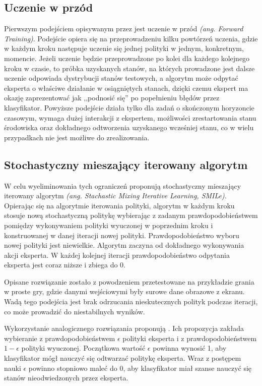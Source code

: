 \documentclass[polish,master,a4paper,oneside]{ppfcmthesis}
\begin{document}
\subsection{Uczenie w przód}
Pierwszym podejściem opisywanym przez \cite{bagnell2010efficient} jest uczenie w przód \textit{(ang. Forward Training)}. Podejście opiera się na przeprowadzeniu kilku powtórzeń uczenia, gdzie w każdym kroku następuje uczenie się jednej polityki w jednym, konkretnym, momencie. Jeżeli uczenie będzie przeprowadzone po kolei dla każdego kolejnego kroku w czasie, to próbka uzyskanych stanów, na których prowadzone jest dalsze uczenie odpowiada dystrybucji stanów testowych, a algorytm może odpytać eksperta o właściwe działanie w osiągniętych stanach, dzięki czemu ekspert ma okazję zaprezentować jak ,,podnosić się'' po popełnieniu błędów przez klasyfikator. Powyższe podejście działa tylko dla zadań o skończonym horyzoncie czasowym, wymaga dużej interakcji z ekspertem, możliwości zrestartowania stanu środowiska oraz dokładnego odtworzenia uzyskanego wcześniej stanu, co w wielu przypadkach nie jest możliwe do zrealizowania.

\subsection{Stochastyczny mieszający iterowany algorytm}\label{smile}
W celu wyeliminowania tych ograniczeń \cite{DBLP:journals/corr/abs-1011-0686} proponują stochastyczny mieszający iterowany algorytm \textit{(ang. Stachastic Mixing Iterative Learning, SMILe)}. Opierając się na algorytmie iterowania polityki, algorytm w każdym kroku stosuje nową stochastyczną politykę wybierając z zadanym prawdopodobieństwem pomiędzy wykonywaniem polityki wyuczonej w poprzednim kroku i konstruowanej w danej iteracji nowej polityki. Prawdopodobieństwo wyboru nowej polityki jest niewielkie. Algorytm zaczyna od dokładnego wykonywania akcji eksperta. W każdej kolejnej iteracji prawdopodobieństwo odpytania eksperta jest coraz niższe i zbiega do 0.

Opisane rozwiązanie zostało z powodzeniem przetestowane na przykładzie grania w proste gry, gdzie danymi wejściowymi były surowe dane obrazowe z ekranu. Wadą tego podejścia jest brak odrzucania nieskutecznych polityk podczas iteracji, co może prowadzić do niestabilnych wyników.

Wykorzystanie analogicznego rozwiązania proponują \cite{DBLP:journals/corr/BengioVJS15}. Ich propozycja zakłada wybieranie z prawdopodobieństwem $\epsilon$ polityki eksperta i z prawdopodobieństwem $1-\epsilon$ polityki wyuczonej. Początkowa wartość $\epsilon$ powinna wynosić 1, aby klasyfikator mógł nauczyć się  odtwarzać politykę eksperta. Wraz z postępem nauki $\epsilon$ powinno stopniowo maleć do 0, aby klasyfikator miał szanse nauczyć się stanów nieodwiedzonych przez eksperta.
\end{document}
